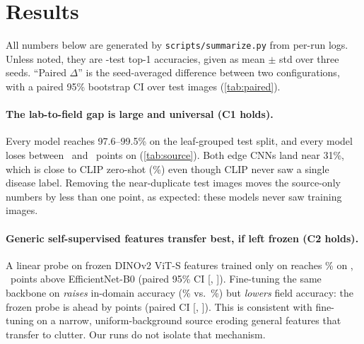 \section{Results}
\label{sec:results}

All numbers below are generated by \texttt{scripts/summarize.py} from per-run logs.
Unless noted, they are \PD-test top-1 accuracies, given as mean $\pm$ std over three seeds.
``Paired $\Delta$'' is the seed-averaged difference between two configurations, with a paired 95\% bootstrap CI over \PD test images (\cref{tab:paired}).

\begin{table}[t]
\centering\small

\caption{\textbf{Trained on \PV only} (28 classes, no field labels). PV = in-domain \PV leaf-grouped test top-1; PD = \PD test top-1; PD$_\text{dedup}$ = \PD test with \PDdups near-duplicates of \PD-train removed; PD F1 = macro-F1 over the 27 classes present; Gap = PV$-$PD; CI$_{95}$ = average half-width of the per-run 95\% bootstrap interval on PD. Mean $\pm$ std over 3 seeds.}
\label{tab:source}
\end{table}

\paragraph{The lab-to-field gap is large and universal (C1 holds).}
Every model reaches 97.6--99.5\% on the leaf-grouped \PV test split, and every model loses between \dinovtwoslpGap\ and \mnvthreeGap\ points on \PD (\cref{tab:source}).
Both edge CNNs land near 31\%, which is close to CLIP zero-shot (\ClipPD\%) even though CLIP never saw a single disease label.
Removing the \PDdups near-duplicate test images moves the source-only numbers by less than one point, as expected: these models never saw \PD training images.

\paragraph{Generic self-supervised features transfer best, if left frozen (C2 holds).}
A linear probe on frozen DINOv2 ViT-S features trained only on \PV reaches \dinovtwoslppvpre\% on \PD, \PCa\ points above EfficientNet-B0 (paired 95\% CI [\PCalo, \PCahi]).
Fine-tuning the same backbone on \PV \emph{raises} in-domain accuracy (\dinovtwosftPVin\% vs.\ \dinovtwoslpPVin\%) but \emph{lowers} field accuracy: the frozen probe is ahead by \PCb points (paired CI [\PCblo, \PCbhi]).
This is consistent with fine-tuning on a narrow, uniform-background source eroding general features that transfer to clutter. Our runs do not isolate that mechanism.

